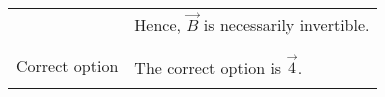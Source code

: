 \documentclass[journal,12pt,twocolumn]{IEEEtran}
\begin{document}
\begin{table}[h!]
\begin{center}
\begin{tabular}{|p{5cm}|p{10cm}|}
& Hence, $\vec{B}$ is necessarily invertible.\\
&\\
\hline
&\\
Correct option  & The correct option is $\vec{4}$.\\
&\\
\hline
    \end{tabular}
    \end{center}
\end{table}
\end{document}
